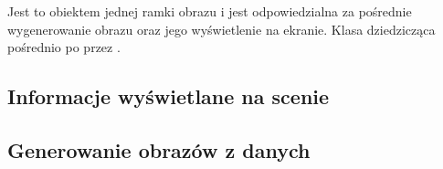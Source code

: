 
Jest to obiektem jednej ramki obrazu i jest odpowiedzialna za pośrednie wygenerowanie obrazu oraz jego wyświetlenie na ekranie.
Klasa dziedzicząca pośrednio po  przez .

\subsection{Informacje wyświetlane na scenie}


\subsection{Generowanie obrazów z danych}


